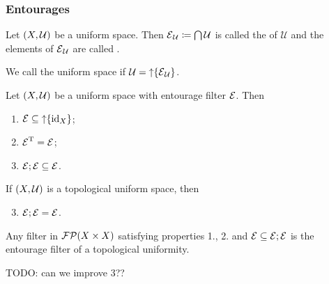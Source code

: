 \subsubsection{Entourages}
\begin{definition}
Let $\left( X, \mathcal{U} \right)$ be a uniform space. Then $\operatorname{\mathcal{E}}_\mathcal{U} \coloneqq \bigcap \mathcal{U}$ is called the  of $\mathcal{U}$ and the elements of $\operatorname{\mathcal{E}}_\mathcal{U}$ are called .

We call the uniform space  if $\mathcal{U} = \operatorname{\uparrow}\{\operatorname{\mathcal{E}}_\mathcal{U}\}$.
\end{definition}

\begin{lemma} \label{entourageLemma}
Let $\left( X,\mathcal{U} \right)$ be a uniform space with entourage filter $\operatorname{\mathcal{E}}$. Then
\begin{enumerate}
\item $\operatorname{\mathcal{E}}\subseteq \operatorname{\uparrow}\{\operatorname{id}_X\}$;
\item $\operatorname{\mathcal{E}}^{\mathrm{T}} = \operatorname{\mathcal{E}}$;
\item $\operatorname{\mathcal{E}};\operatorname{\mathcal{E}} \subseteq \operatorname{\mathcal{E}}$.
\end{enumerate}
If $\left( X,\mathcal{U} \right)$ is a topological uniform space, then
\begin{enumerate}[1'.] \setcounter{enumi}{2}
\item $\operatorname{\mathcal{E}};\operatorname{\mathcal{E}} = \operatorname{\mathcal{E}}$.
\end{enumerate}
Any filter in $\operatorname{\mathcal{FP}}(X\times X)$ satisfying properties 1., 2. and $\operatorname{\mathcal{E}} \subseteq \operatorname{\mathcal{E}};\operatorname{\mathcal{E}}$ is the entourage filter of a topological uniformity.
\end{lemma}
TODO: can we improve 3??
